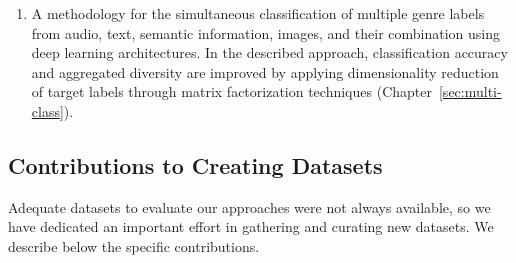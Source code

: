 \begin{enumerate}

\item 
A methodology for the simultaneous classification of multiple genre labels from audio, text, semantic information, images, and their combination using deep learning architectures. In the described approach, classification accuracy and aggregated diversity are improved by applying dimensionality reduction of target labels through matrix factorization techniques (Chapter~\ref{sec:multi-class}). %

\end{enumerate}

\subsection{Contributions to Creating Datasets}

Adequate datasets to evaluate our approaches were not always available, so we have dedicated an important effort in gathering and curating new datasets. We describe below the specific contributions. 

